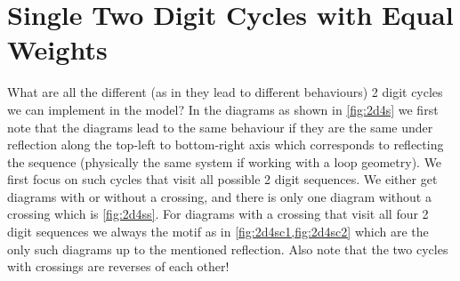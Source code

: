 \documentclass[11pt]{article}
\theoremstyle{nothm}
\begin{document}
\section{Single Two Digit Cycles with Equal Weights}\label{sec:s2dfc}
What are all the different (as in they lead to different behaviours) 2 digit cycles we can implement in the model?
In the diagrams as shown in \cref{fig:2d4s} we first note that the diagrams lead to the same behaviour if they are the same under reflection along the top-left to bottom-right axis which corresponds to reflecting the sequence (physically the same system if working with a loop geometry).
We first focus on such cycles that visit all possible 2 digit sequences.
We either get diagrams with or without a crossing, and there is only one diagram without a crossing which is \cref{fig:2d4ss}.
For diagrams with a crossing that visit all four 2 digit sequences we always the motif as in \cref{fig:2d4sc1,fig:2d4sc2} which are the only such diagrams up to the mentioned reflection.
Also note that the two cycles with crossings are reverses of each other!
\end{document}
